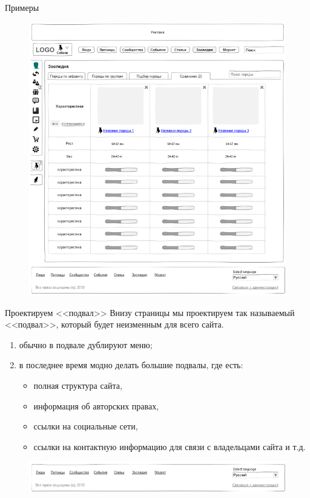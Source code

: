 \documentclass{beamer}
\begin{document}
\begin{frame}[t]{Примеры}
\begin{figure}[h]
\centering
\includegraphics[scale=0.4]{images/SLJ_maket3-sm.png}
\end{figure}
\end{frame}

\begin{frame}[t]{Проектируем <<подвал>>}
Внизу страницы мы проектируем так называемый <<подвал>>, который будет неизменным для всего сайта.
\begin{enumerate}
\item обычно в подвале дублируют меню;
\item в последнее время модно делать большие подвалы, где есть:
	\begin{itemize}
	\item полная структура сайта, 
	\item информация об авторских правах,
	\item ссылки на социальные сети,
	\item ссылки на контактную информацию для связи с владельцами сайта и т.д.
	\end{itemize}
\end{enumerate}
\begin{figure}[h]
\centering
\includegraphics[scale=0.6]{images/SLJ_maket4-sm.png}
\end{figure}
\end{frame}
\end{document}
